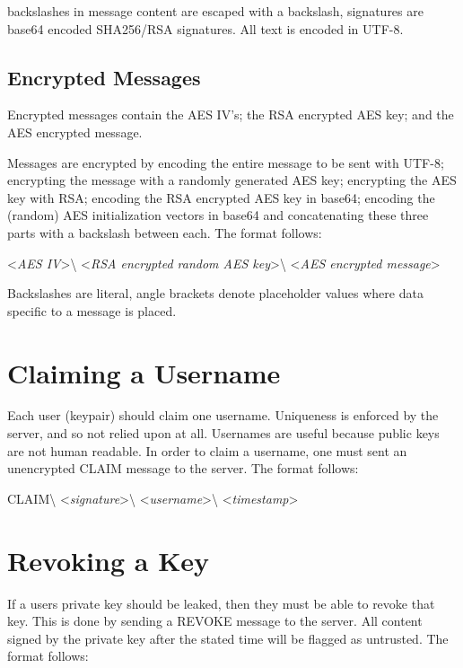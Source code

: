 backslashes in message content are escaped with a backslash, signatures are
base64 encoded SHA256/RSA signatures. All text is encoded in UTF-8.


\subsection{Encrypted Messages}
Encrypted messages contain the AES IV's; the RSA encrypted AES key; and the AES
encrypted message.

Messages are encrypted by encoding the entire message to be sent with UTF-8;
encrypting the message with a randomly generated AES key; encrypting the AES key
with RSA; encoding the RSA encrypted AES key in base64; encoding the (random)
AES initialization vectors in base64 and concatenating these three parts with a
backslash between each. The format follows:

\begin{center}
\textless \textit{AES IV}\textgreater\textbackslash
\textless \textit{RSA encrypted random AES key}\textgreater\textbackslash
\textless \textit{AES encrypted message}\textgreater
\end{center}

Backslashes are literal, angle brackets denote placeholder values where data
specific to a message is placed.


\section{Claiming a Username}
Each user (keypair) should claim one username. Uniqueness is enforced by the
server, and so not relied upon at all. Usernames are useful because public keys
are not human readable. In order to claim a username, one must sent an
unencrypted CLAIM message to the server. The format follows:

\begin{center}
CLAIM\textbackslash
\textless \textit{signature}\textgreater\textbackslash
\textless \textit{username}\textgreater\textbackslash
\textless \textit{timestamp}\textgreater
\end{center}

\section{Revoking a Key}
If a users private key should be leaked, then they must be able to revoke that
key. This is done by sending a REVOKE message to the server. All content signed
by the private key after the stated time will be flagged as untrusted. The
format follows:

